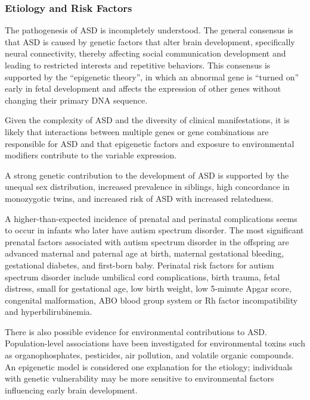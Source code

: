 \subsubsection{Etiology and Risk Factors}
The pathogenesis of ASD is incompletely understood. The general consensus is
that ASD is caused by genetic factors that alter brain development,
specifically neural connectivity, thereby affecting social communication
development and leading to restricted interests and repetitive behaviors.
This consensus is supported by the ``epigenetic theory'', in which an abnormal
gene is ``turned on'' early in fetal development and affects the expression of
other genes without changing their primary DNA sequence. \cite{AutismUpToDate}

Given the complexity of ASD and the diversity of clinical manifestations, it is
likely that interactions between multiple genes or gene combinations are
responsible for ASD and that epigenetic factors and exposure to environmental
modifiers contribute to the variable expression. \cite{AutismUpToDate}

A strong genetic contribution to the development of ASD is supported by the
unequal sex distribution, increased prevalence in siblings, high concordance in
monozygotic twins, and increased risk of ASD with increased relatedness.
\cite{AutismUpToDate}

A higher-than-expected incidence of prenatal and perinatal complications seems
to occur in infants who later have autism spectrum disorder. The most
significant prenatal factors associated with autism spectrum disorder in the
offspring are advanced maternal and paternal age at birth, maternal gestational
bleeding, gestational diabetes, and first-born baby. Perinatal risk factors for
autism spectrum disorder include umbilical cord complications, birth trauma,
fetal distress, small for gestational age, low birth weight, low 5-minute Apgar
score, congenital malformation, ABO blood group system or Rh factor
incompatibility and hyperbilirubinemia. \cite{Boland2021-by}

There is also possible evidence for environmental contributions to ASD.
Population-level associations have been investigated for environmental toxins
such as organophosphates, pesticides, air pollution, and volatile organic
compounds. An epigenetic model is considered one explanation for the etiology;
individuals with genetic vulnerability may be more sensitive to environmental
factors influencing early brain development. \cite{Nelson58}

